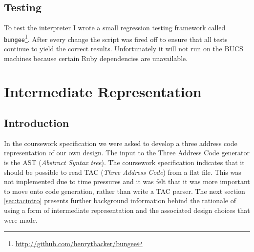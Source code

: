 \subsection{Testing}
To test the interpreter I wrote a small regression testing framework called \verb!bungee!\footnote{\url{http://github.com/henrythacker/bungee}}. After every change the script was fired off to ensure that all tests continue to yield the correct results. Unfortunately it will not run on the BUCS machines because certain Ruby dependencies are unavailable.

\section{Intermediate Representation}

\subsection{Introduction}
In the coursework specification we were asked to develop a three address code representation of our own design. The input to the Three Address Code generator is the AST (\emph{Abstract Syntax tree}). The coursework specification indicates that it should be possible to read TAC (\emph{Three Address Code}) from a flat file. This was not implemented due to time pressures and it was felt that it was more important to move onto code generation, rather than write a TAC parser. The next section \ref{sec:tacintro} presents further background information behind the rationale of using a form of intermediate representation and the associated design choices that were made.

